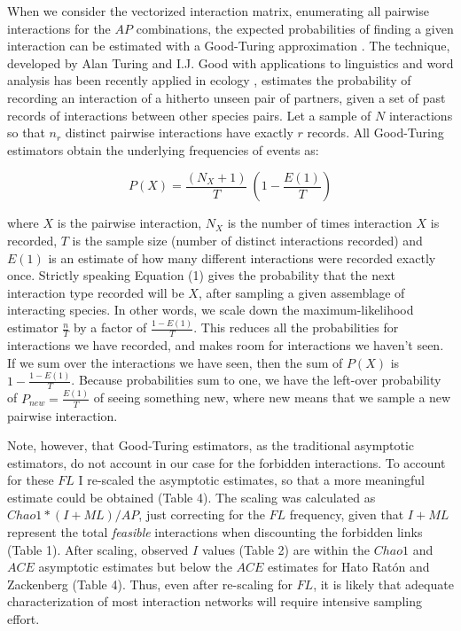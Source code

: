 \documentclass[12pt]{article}
\begin{document}
When we consider the vectorized interaction matrix, enumerating all pairwise interactions for the $AP$ combinations, the expected probabilities of finding a given interaction can be estimated with a Good-Turing approximation \citep{Good:1953tn}. The technique, developed by Alan Turing and I.J. Good with applications to linguistics and word analysis \citep{Gale:1995uy} has been recently applied in ecology \citep{Chao:2015tc}, estimates the probability of recording an interaction of a hitherto unseen pair of partners, given a set of past records of interactions between other species pairs. Let a sample of $N$ interactions so that $n_r$ distinct pairwise interactions have exactly $r$ records. All Good-Turing estimators obtain the underlying frequencies of events as:

\begin{equation}
P(X)= \frac{(N_X + 1)}{T}\ (1-\frac{E(1)}{T})
\end{equation}

where $X$ is the pairwise interaction, $N_X$ is the number of times interaction $X$ is recorded, $T$ is the sample size (number of distinct interactions recorded) and $E(1)$ is an estimate of how many different interactions were recorded exactly once. Strictly speaking Equation (1) gives the probability that the next interaction type recorded will be $X$, after sampling a given assemblage of interacting species. In other words, we scale down the maximum-likelihood estimator $\frac{n}{T}$ by a factor of $\frac{1-E(1)}{T}$. This reduces all the probabilities for interactions we have recorded, and makes room for interactions we haven’t seen. If we sum over the interactions we have seen, then the sum of $P(X)$ is $1-\frac{1-E(1)}{T}$. Because probabilities sum to one, we have the left-over probability of
$P_{new}= \frac{E(1)}{T}$ of seeing something new, where new means that we sample a new pairwise interaction.

Note, however, that Good-Turing estimators, as the traditional asymptotic estimators, do not account in our case for the forbidden interactions. To account for these $FL$ I re-scaled the asymptotic estimates, so that a more meaningful estimate could be obtained (Table 4). The scaling was calculated as $Chao1*(I+{ML})/{AP}$, just correcting for the $FL$ frequency, given that $I+{ML}$ represent the total \emph{feasible} interactions when discounting the forbidden links (Table 1). After scaling, observed $I$ values (Table 2) are within the $Chao1$ and $ACE$ asymptotic estimates but below the $ACE$ estimates for Hato Rat\'on and Zackenberg (Table 4). Thus, even after re-scaling for $FL$, it is likely that adequate characterization of most interaction networks will require intensive sampling effort.
\end{document}
